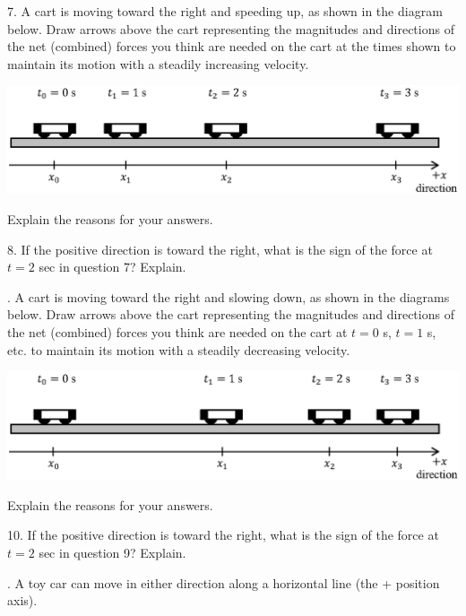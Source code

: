 7. A cart is moving toward the right and speeding up, as shown in the diagram
below. Draw arrows above the cart representing the magnitudes and directions
of the net (combined) forces you think are needed on the cart at the times shown
to maintain its motion with a steadily increasing velocity.

\vspace{0.3cm}
{\par\centering \includegraphics{force2/carts_speeding_hw1.eps} \par}
\vspace{0.3cm}

Explain the reasons for your answers.
\answerspace{20mm}

8. If the positive direction is toward the right, what is the sign of the force
at $t = 2$ sec in question 7? Explain.
\answerspace{20mm}

. A cart is moving toward the right and slowing down, as shown in the diagrams
below. Draw arrows above the cart representing the magnitudes and directions
of the net (combined) forces you think are needed on the cart at $t = 0$ s, 
$t
= 1$ s, etc. to maintain its motion with a steadily decreasing velocity.

\vspace{0.3cm}
{\par\centering \includegraphics{force2/carts_slowing_hw2.eps} \par}
\vspace{0.3cm}

Explain the reasons for your answers.
\answerspace{25mm}

10. If the positive direction is toward the right, what is the sign of the force
at $t = 2$ sec in question 9? Explain.
\answerspace{25mm}

. A toy car can move in either direction along a horizontal line (the + position
axis).

